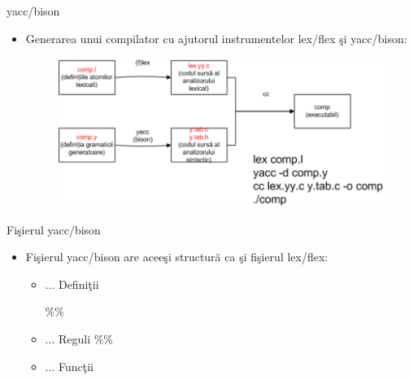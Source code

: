 \documentclass[pdf]{beamer}
\begin{document}
\begin{frame}{yacc/bison}
\begin{itemize}
	\item
	Generarea unui compilator cu ajutorul instrumentelor lex/flex şi yacc/bison: 
		\linebreak

\begin{figure}
	\includegraphics[width=\linewidth]{imgYacc1.png}
  	\label{fig:schema1}
\end{figure}

\end{itemize}
\end{frame}



\begin{frame}{Fişierul yacc/bison}
\begin{itemize}
	\item
	Fişierul yacc/bison are aceeşi structură ca şi fişierul lex/flex:
		\linebreak

	\begin{itemize}
	    	\item
		... Definiţii
			\linebreak
	
		\%\%
		\item
		... Reguli
			\linebreak
		\%\%
			\linebreak
	
		\item
		... Funcţii
	\end{itemize}
\end{itemize}
\end{frame}
\end{document}
